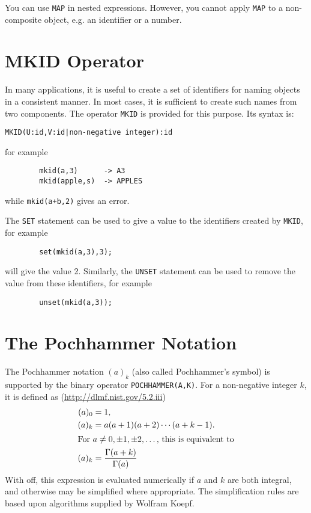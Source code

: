 You can use \texttt{MAP} in nested expressions. However, you cannot
apply \texttt{MAP} to a non-composite object, e.g. an identifier or a number.


\section{MKID Operator}
\hypertarget{operator:MKID}{}
In many applications, it is useful to create a set of identifiers for
naming objects in a consistent manner. In most cases, it is sufficient to
create such names from two components. The operator \texttt{MKID} is provided
for this purpose. Its syntax is:
\begin{verbatim}
MKID(U:id,V:id|non-negative integer):id
\end{verbatim}
for example
\begin{verbatim}
        mkid(a,3)      -> A3
        mkid(apple,s)  -> APPLES
\end{verbatim}
while \texttt{mkid(a+b,2)} gives an error.

The \texttt{SET} statement can be used to give a value to the
identifiers created by \texttt{MKID}, for example
\begin{verbatim}
        set(mkid(a,3),3);
\end{verbatim}
will give  the value 2.
Similarly, the \texttt{UNSET} statement can be used to
remove the value from these identifiers, for example
\begin{verbatim}
        unset(mkid(a,3));
\end{verbatim}


\section{The Pochhammer Notation}

The Pochhammer notation $(a)_k$ (also called Pochhammer's symbol) is supported by the binary operator \texttt{POCHHAMMER(A,K)}.
For a non-negative integer $k$, it is defined as (\url{http://dlmf.nist.gov/5.2.iii})
\begin{align*}
  (a)_0 &= 1, \\
  (a)_k &= a(a+1)(a+2)\cdots(a+k-1).\\
\intertext{For $a\not=0,\pm1,\pm2,\dots$, this is equivalent to}
  (a)_k &= \frac{\Gamma(a+k)}{\Gamma(a)}
\end{align*}
With  off, this expression is evaluated
numerically if $a$ and $k$ are both integral, and otherwise may be
simplified where appropriate.  The simplification rules are based upon
algorithms supplied by Wolfram Koepf.%


